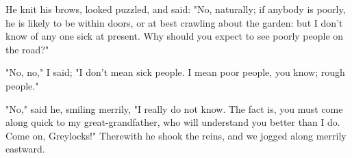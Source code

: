 He knit his brows, looked puzzled, and said: "No, naturally; if anybody
is poorly, he is likely to be within doors, or at best crawling about
the garden: but I don't know of any one sick at present. Why should you
expect to see poorly people on the road?"

"No, no," I said; "I don't mean sick people. I mean poor people, you
know; rough people."

"No," said he, smiling merrily, "I really do not know. The fact is, you
must come along quick to my great-grandfather, who will understand you
better than I do. Come on, Greylocks!" Therewith he shook the reins, and
we jogged along merrily eastward.
